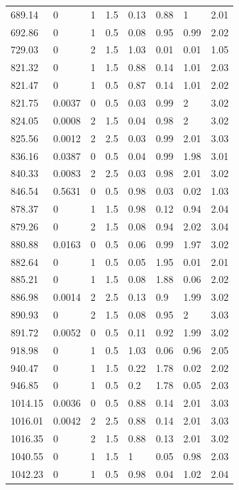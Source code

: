 \begin{longtable}[!h] {p{} p{} p{} p{} p{} p{} p{} p{}}
	689.14	&	0		&	1	&	1.5	&	0.13	&	0.88	&	1		&	2.01    \\
	692.86	&	0		&	1	&	0.5	&	0.08	&	0.95	&	0.99	&	2.02    \\
	729.03	&	0		&	2	&	1.5	&	1.03	&	0.01	&	0.01	&	1.05    \\
	821.32	&	0		&	1	&	1.5	&	0.88	&	0.14	&	1.01	&	2.03    \\
	821.47	&	0		&	1	&	0.5	&	0.87	&	0.14	&	1.01	&	2.02    \\
	821.75	&	0.0037	&	0	&	0.5	&	0.03	&	0.99	&	2		&	3.02    \\
	824.05	&	0.0008	&	2	&	1.5	&	0.04	&	0.98	&	2		&	3.02    \\
	825.56	&	0.0012	&	2	&	2.5	&	0.03	&	0.99	&	2.01	&	3.03    \\
	836.16	&	0.0387	&	0	&	0.5	&	0.04	&	0.99	&	1.98	&	3.01    \\
	840.33	&	0.0083	&	2	&	2.5	&	0.03	&	0.98	&	2.01	&	3.02    \\
	846.54	&	0.5631	&	0	&	0.5	&	0.98	&	0.03	&	0.02	&	1.03    \\
	878.37	&	0		&	1	&	1.5	&	0.98	&	0.12	&	0.94	&	2.04    \\
	879.26	&	0		&	2	&	1.5	&	0.08	&	0.94	&	2.02	&	3.04    \\
	880.88	&	0.0163	&	0	&	0.5	&	0.06	&	0.99	&	1.97	&	3.02    \\
	882.64	&	0		&	1	&	0.5	&	0.05	&	1.95	&	0.01	&	2.01    \\
	885.21	&	0		&	1	&	1.5	&	0.08	&	1.88	&	0.06	&	2.02    \\
	886.98	&	0.0014	&	2	&	2.5	&	0.13	&	0.9		&	1.99	&	3.02    \\
	890.93	&	0		&	2	&	1.5	&	0.08	&	0.95	&	2		&	3.03    \\
	891.72	&	0.0052	&	0	&	0.5	&	0.11	&	0.92	&	1.99	&	3.02    \\
	918.98	&	0		&	1	&	0.5	&	1.03	&	0.06	&	0.96	&	2.05    \\
	940.47	&	0		&	1	&	1.5	&	0.22	&	1.78	&	0.02	&	2.02    \\
	946.85	&	0		&	1	&	0.5	&	0.2		&	1.78	&	0.05	&	2.03    \\
	1014.15	&	0.0036	&	0	&	0.5	&	0.88	&	0.14	&	2.01	&	3.03    \\
	1016.01	&	0.0042	&	2	&	2.5	&	0.88	&	0.14	&	2.01	&	3.03    \\
	1016.35	&	0		&	2	&	1.5	&	0.88	&	0.13	&	2.01	&	3.02    \\
	1040.55	&	0		&	1	&	1.5	&	1		&	0.05	&	0.98	&	2.03    \\
	1042.23	&	0		&	1	&	0.5	&	0.98	&	0.04	&	1.02	&	2.04    \\

\end{longtable}
